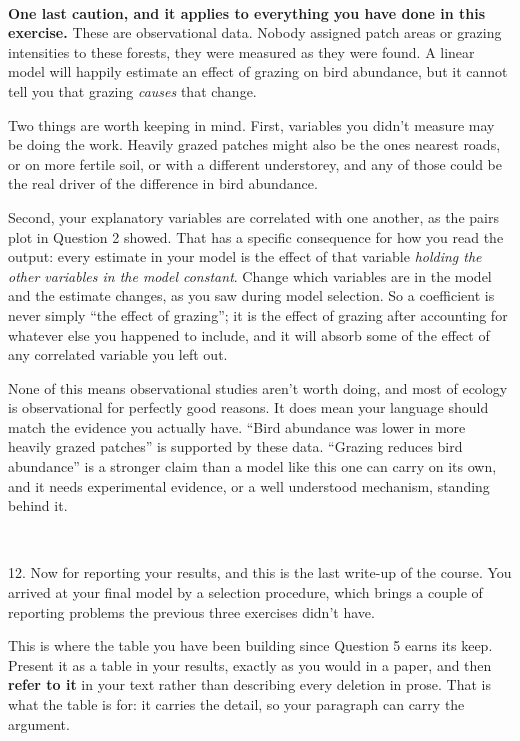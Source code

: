 \documentclass[
]{article}
\begin{document}
~

\textbf{One last caution, and it applies to everything you have done in
this exercise.} These are observational data. Nobody assigned patch
areas or grazing intensities to these forests, they were measured as
they were found. A linear model will happily estimate an effect of
grazing on bird abundance, but it cannot tell you that grazing
\emph{causes} that change.

Two things are worth keeping in mind. First, variables you didn't
measure may be doing the work. Heavily grazed patches might also be the
ones nearest roads, or on more fertile soil, or with a different
understorey, and any of those could be the real driver of the difference
in bird abundance.

Second, your explanatory variables are correlated with one another, as
the pairs plot in Question 2 showed. That has a specific consequence for
how you read the output: every estimate in your model is the effect of
that variable \emph{holding the other variables in the model constant}.
Change which variables are in the model and the estimate changes, as you
saw during model selection. So a coefficient is never simply ``the
effect of grazing''; it is the effect of grazing after accounting for
whatever else you happened to include, and it will absorb some of the
effect of any correlated variable you left out.

None of this means observational studies aren't worth doing, and most of
ecology is observational for perfectly good reasons. It does mean your
language should match the evidence you actually have. ``Bird abundance
was lower in more heavily grazed patches'' is supported by these data.
``Grazing reduces bird abundance'' is a stronger claim than a model like
this one can carry on its own, and it needs experimental evidence, or a
well understood mechanism, standing behind it.

~

12. Now for reporting your results, and this is the last write-up of the
course. You arrived at your final model by a selection procedure, which
brings a couple of reporting problems the previous three exercises
didn't have.

This is where the table you have been building since Question 5 earns
its keep. Present it as a table in your results, exactly as you would in
a paper, and then \textbf{refer to it} in your text rather than
describing every deletion in prose. That is what the table is for: it
carries the detail, so your paragraph can carry the argument.
\end{document}
